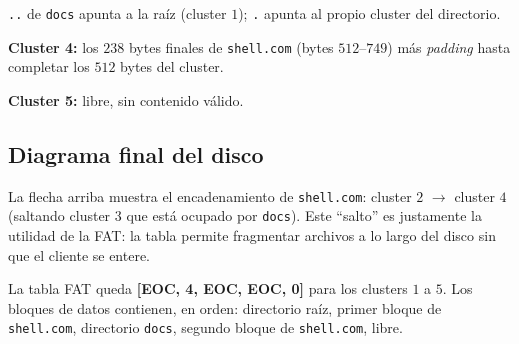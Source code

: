 \documentclass[11pt,a4paper]{article}
\begin{document}
\noindent\texttt{..} de \texttt{docs} apunta a la raíz (cluster $1$);
\texttt{.} apunta al propio cluster del directorio.

\textbf{Cluster 4:} los $238$ bytes finales de \texttt{shell.com}
(bytes $512$--$749$) más \emph{padding} hasta completar los $512$
bytes del cluster.

\textbf{Cluster 5:} libre, sin contenido válido.

\subsection*{Diagrama final del disco}

\begin{center}
\end{center}

La flecha arriba muestra el encadenamiento de \texttt{shell.com}:
cluster $2$ $\to$ cluster $4$ (saltando cluster $3$ que está ocupado
por \texttt{docs}). Este ``salto'' es justamente la utilidad de la
FAT: la tabla permite fragmentar archivos a lo largo del disco sin
que el cliente se entere.

\begin{respuesta}
La tabla FAT queda \textbf{[EOC, 4, EOC, EOC, 0]} para los clusters
$1$ a $5$. Los bloques de datos contienen, en orden: directorio raíz,
primer bloque de \texttt{shell.com}, directorio \texttt{docs}, segundo
bloque de \texttt{shell.com}, libre.
\end{respuesta}
\end{document}
